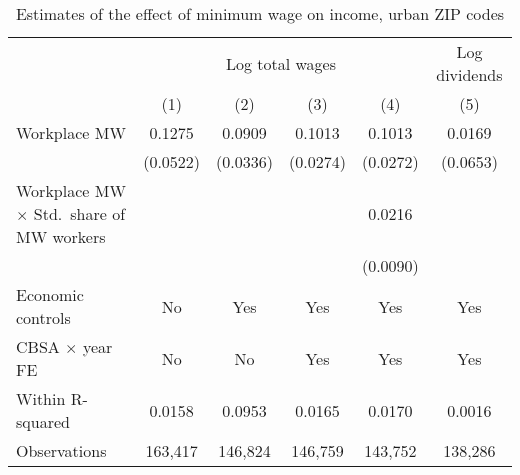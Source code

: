 \begin{table}[hbt!]
    \centering
    \caption{Estimates of the effect of minimum wage on income, urban ZIP codes}
    \label{tab:static_wages}

    \begin{tabular}{@{}lccccc@{}}
        \toprule
                                & \multicolumn{4}{c}{Log total wages}
                                & \multicolumn{1}{c}{Log dividends}                        \\ \cmidrule(lr){2-5}\cmidrule(lr){6-6}
                                & (1)       & (2)      & (3)      & (4)       & (5)        \\ \midrule
        Workplace MW            & 0.1275       & 0.0909      & 0.1013      & 0.1013       & 0.0169        \\
                                & (0.0522)     & (0.0336)    & (0.0274)    & (0.0272)     & (0.0653)      \\
        Workplace MW $\times$ Std.\ 
            share of MW workers &           &          &          & 0.0216       &            \\
                                &           &          &          & (0.0090)     &            \\ \midrule
        Economic controls       & No        & Yes      & Yes      & Yes       & Yes        \\
        CBSA $\times$ year FE   & No        & No       & Yes      & Yes       & Yes        \\
        Within R-squared        & 0.0158       & 0.0953      & 0.0165      & 0.0170       & 0.0016        \\
        Observations            & 163,417      & 146,824     & 146,759     & 143,752      & 138,286       \\ \bottomrule
    \end{tabular}


\end{table}
